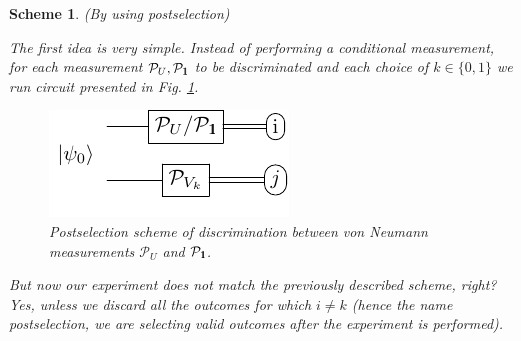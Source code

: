 \documentclass[preprint,12pt, a4paper]{elsarticle}
\newcommand{\ket}[1]{\ensuremath{|#1\rangle}}
\newcommand{\bra}[1]{\ensuremath{\langle#1|}}
\newcommand{\ketbra}[2]{\ensuremath{\ket{#1}\bra{#2}}}
\newcommand{\proj}[1]{\ensuremath{\ketbra{#1}{#1}}}
\newcommand{\1}{{\rm 1\hspace{-0.9mm}l}}
\newcommand{\Id}{{\rm 1\hspace{-0.9mm}l}}
\newcommand{\PP}{\mathcal{P}}
\newtheorem{scheme}{Scheme}
\begin{document}
\begin{scheme}(By using postselection)

The first idea is very simple. Instead of performing a conditional measurement, for each
measurement $\PP_U, \PP_\Id$ to be discriminated and each choice of $k \in \{0, 1\}$ we run circuit presented in Fig. \ref{fig:postselection}.

\begin{figure}[h!]
	\centering
	\includegraphics[scale=1.7]{pics/postselection_no_channels}

	\caption{
		Postselection scheme of discrimination between von Neumann measurements $\PP_{U}$ and $\PP_\Id$.
	}\label{fig:postselection}
\end{figure}

But now our experiment does not match the previously described scheme, right?
Yes, unless we discard all the outcomes for which $i\ne k$ (hence the name \emph{postselection},
we are selecting valid outcomes after the experiment is performed).





\end{scheme}
\end{document}
